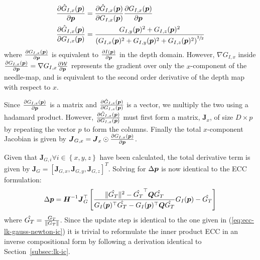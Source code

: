 \begin{equation}\label{eq:ip-ecc-chain-rule}
    \begin{aligned}
        \frac{\partial \hat{G}_{I,x}(\p)}{\partial \p}          &= \frac{\partial \hat{G}_{I,x}(\p)}{\partial G_{I,x}(\p)} \frac{\partial G_{I,x}(\p)}{\partial \p} \\
        \frac{\partial \hat{G}_{I,x}(\p)}{\partial G_{I,x}(\p)} &= \frac{G_{I,y}(\p)^2 + G_{I,z}(\p)^2}{\left(G_{I,x}(\p)^2 + G_{I,y}(\p)^2 + G_{I,z}(\p)^2 \right)^{\sfrac{3}{2}}}
    \end{aligned}
\end{equation}
where $\frac{\partial G_{I,x}(\boldsymbol{p})}{\partial \boldsymbol{p}}$ is equivalent to $\frac{\partial I(\boldsymbol{p})}{\partial \boldsymbol{p}}$ in the depth domain. However, $\nabla G_{I,x}$ inside $\frac{\partial G_{I,x}(\boldsymbol{p})}{\partial \boldsymbol{p}} = \nabla G_{I,x} \frac{\partial \mathcal{W}}{\partial \boldsymbol{p}}$ represents the gradient over only the $x$-component of the needle-map, and is equivalent to the second order derivative of the depth map with respect to $x$. 

Since $\frac{\partial G_{I,x}(\boldsymbol{p})}{\partial \boldsymbol{p}}$ is a matrix and $\frac{\partial \hat{G}_{I,x}(\boldsymbol{p})}{\partial G_{I,x}(\boldsymbol{p})}$ is a vector, we multiply the two using a hadamard product. However, $\frac{\partial \hat{G}_{I,x}(\boldsymbol{p})}{\partial G_{I,x}(\boldsymbol{p})}$ must first form a matrix, $\boldsymbol{J}_x$, of size $D \times p$ by repeating the vector $p$ to form the columns. Finally the total $x$-component Jacobian is given by $\boldsymbol{J}_{G,x} = \boldsymbol{J}_x \odot \frac{\partial G_{I,x}(\boldsymbol{p})}{\partial \boldsymbol{p}}$.

Given that $\boldsymbol{J}_{G,i} \forall i \in \left\{ x,y,z \right\}$ have been calculated, the total derivative term is given by $\boldsymbol{J}_G = \left[ \boldsymbol{J}_{G,x}, \boldsymbol{J}_{G,y}, \boldsymbol{J}_{G,z} \right]^T$. Solving for $\Delta \boldsymbol{p}$ is now identical to the ECC formulation:
\begin{equation}\label{eq:ip-ecc-lk-gauss-newton-ic}
    \Delta \p = \boldsymbol{H}^{-1} \boldsymbol{J}_G^{\top} \left[ \frac{\norm{\hat{G_T}}^2 - \hat{G_T}^{\top} \boldsymbol{Q} \hat{G_T}}{G_I(\p)^{\top} \hat{G_T} - G_I(\p)^{\top} \boldsymbol{Q} \hat{G_T}} G_I(\p) - \hat{G_T} \right]
\end{equation}
where $\hat{G_T} = \frac{G_T}{\lVert G_T \rVert}$. Since the update step is identical to the one given in (\ref{eq:ecc-lk-gauss-newton-ic}) it is trivial to reformulate the inner product ECC in an inverse compositional form by following a derivation identical to Section~\ref{subsec:lk-ic}.
